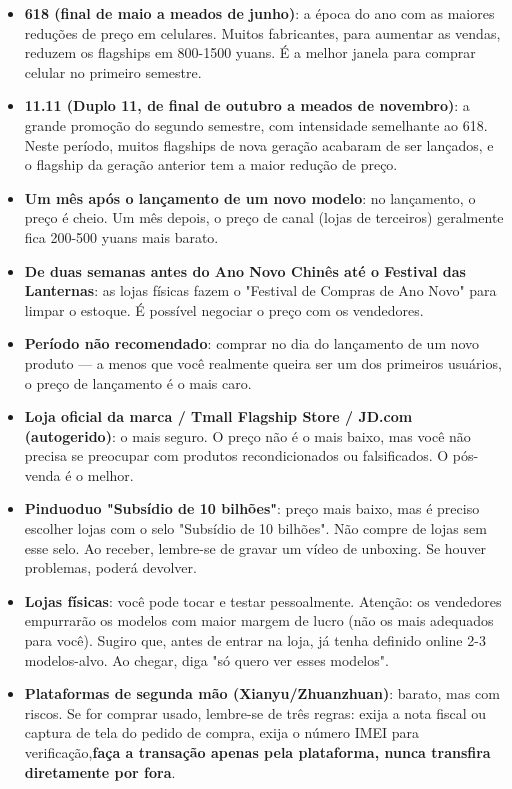 \begin{itemize}
  \item \textbf{618 (final de maio a meados de junho)}: a época do ano com as maiores reduções de preço em celulares. Muitos fabricantes, para aumentar as vendas, reduzem os flagships em 800-1500 yuans. É a melhor janela para comprar celular no primeiro semestre.
  \item \textbf{11.11 (Duplo 11, de final de outubro a meados de novembro)}: a grande promoção do segundo semestre, com intensidade semelhante ao 618. Neste período, muitos flagships de nova geração acabaram de ser lançados, e o flagship da geração anterior tem a maior redução de preço.
  \item \textbf{Um mês após o lançamento de um novo modelo}: no lançamento, o preço é cheio. Um mês depois, o preço de canal (lojas de terceiros) geralmente fica 200-500 yuans mais barato.
  \item \textbf{De duas semanas antes do Ano Novo Chinês até o Festival das Lanternas}: as lojas físicas fazem o "Festival de Compras de Ano Novo" para limpar o estoque. É possível negociar o preço com os vendedores.
  \item \textbf{Período não recomendado}: comprar no dia do lançamento de um novo produto — a menos que você realmente queira ser um dos primeiros usuários, o preço de lançamento é o mais caro.
\end{itemize}


\begin{itemize}
  \item \textbf{Loja oficial da marca / Tmall Flagship Store / JD.com (autogerido)}: o mais seguro. O preço não é o mais baixo, mas você não precisa se preocupar com produtos recondicionados ou falsificados. O pós-venda é o melhor.
  \item \textbf{Pinduoduo "Subsídio de 10 bilhões"}: preço mais baixo, mas é preciso escolher lojas com o selo "Subsídio de 10 bilhões". Não compre de lojas sem esse selo. Ao receber, lembre-se de gravar um vídeo de unboxing. Se houver problemas, poderá devolver.
  \item \textbf{Lojas físicas}: você pode tocar e testar pessoalmente. Atenção: os vendedores empurrarão os modelos com maior margem de lucro (não os mais adequados para você). Sugiro que, antes de entrar na loja, já tenha definido online 2-3 modelos-alvo. Ao chegar, diga "só quero ver esses modelos".
  \item \textbf{Plataformas de segunda mão (Xianyu/Zhuanzhuan)}: barato, mas com riscos. Se for comprar usado, lembre-se de três regras: exija a nota fiscal ou captura de tela do pedido de compra, exija o número IMEI para verificação,\textbf{faça a transação apenas pela plataforma, nunca transfira diretamente por fora}.
\end{itemize}

